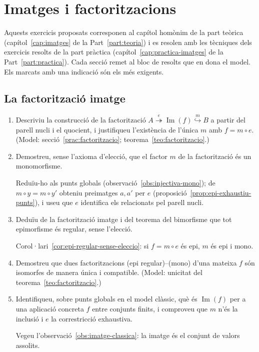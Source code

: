 \chapter{Imatges i factoritzacions}\label{cap:exercicis-imatges}

Aquests exercicis proposats corresponen al capítol homònim de la part teòrica (capítol~\ref{cap:imatges} de la Part~\ref{part:teoria}) i es resolen amb les tècniques dels exercicis resolts de la part pràctica (capítol~\ref{cap:practica-imatges} de la Part~\ref{part:practica}). Cada secció remet al bloc de resolts que en dona el model. Els marcats amb una indicació són els més exigents.

\section{La factorització imatge}

\begin{enumerate}
  \item Descriviu la construcció de la factorització \(A\overset{e}{\twoheadrightarrow}\operatorname{Im}(f)\overset{m}{\hookrightarrow}B\) a partir del parell nucli i el quocient, i justifiqueu l'existència de l'única \(m\) amb \(f=m\circ e\). (Model: secció~\ref{prac:factoritzacio}; teorema~\ref{teo:factoritzacio}.)

  \item Demostreu, sense l'axioma d'elecció, que el factor \(m\) de la factorització és un monomorfisme. \begin{indicacio}Reduïu-ho als punts globals (observació~\ref{obs:injectiva-mono}); de \(m\circ y=m\circ y'\) obteniu preimatges \(a,a'\) per \(e\) (proposició~\ref{prop:epi-exhaustiu-punts}), i useu que \(e\) identifica els relacionats pel parell nucli.\end{indicacio}

  \item Deduïu de la factorització imatge i del teorema del bimorfisme que tot epimorfisme és regular, sense l'elecció. \begin{indicacio}Corol·lari~\ref{cor:epi-regular-sense-eleccio}: si \(f=m\circ e\) és epi, \(m\) és epi i mono.\end{indicacio}

  \item Demostreu que dues factoritzacions (epi regular)--(mono) d'una mateixa \(f\) són isomorfes de manera única i compatible. (Model: unicitat del teorema~\ref{teo:factoritzacio}.)

  \item Identifiqueu, sobre punts globals en el model clàssic, què és \(\operatorname{Im}(f)\) per a una aplicació concreta \(f\) entre conjunts finits, i comproveu que \(m\) n'és la inclusió i \(e\) la correstricció exhaustiva. \begin{indicacio}Vegeu l'observació~\ref{obs:imatge-classica}: la imatge és el conjunt de valors assolits.\end{indicacio}
\end{enumerate}

